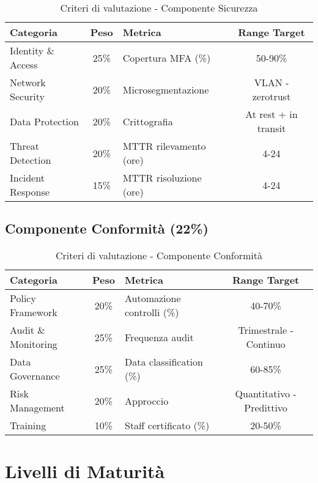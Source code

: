 \begin{table}[H]
\centering
\caption{Criteri di valutazione - Componente Sicurezza}
\small
\begin{tabular}{l c l c}
\toprule
\textbf{Categoria} & \textbf{Peso} & \textbf{Metrica} & \textbf{Range Target} \\
\midrule
Identity \& Access & 25\% & Copertura MFA (\%) & 50-90\% \\
Network Security & 20\% & Microsegmentazione & VLAN - \gls{zerotrust} \\
Data Protection & 20\% & Crittografia & At rest + in transit \\
Threat Detection & 20\% & MTTR rilevamento (ore) & 4-24 \\
Incident Response & 15\% & MTTR risoluzione (ore) & 4-24 \\
\bottomrule
\end{tabular}
\end{table}

\subsection{\texorpdfstring{Componente Conformità (22\%)}{B.3.4 - Componente Conformità (22\%)}}

\begin{table}[H]
\centering
\caption{Criteri di valutazione - Componente Conformità}
\small
\begin{tabular}{l c l c}
\toprule
\textbf{Categoria} & \textbf{Peso} & \textbf{Metrica} & \textbf{Range Target} \\
\midrule
Policy Framework & 20\% & Automazione controlli (\%) & 40-70\% \\
Audit \& Monitoring & 25\% & Frequenza audit & Trimestrale - Continuo \\
Data Governance & 25\% & Data classification (\%) & 60-85\% \\
Risk Management & 20\% & Approccio & Quantitativo - Predittivo \\
Training & 10\% & Staff certificato (\%) & 20-50\% \\
\bottomrule
\end{tabular}
\end{table}

\section{\texorpdfstring{Livelli di Maturità}{B.4 - Livelli di Maturità}}

